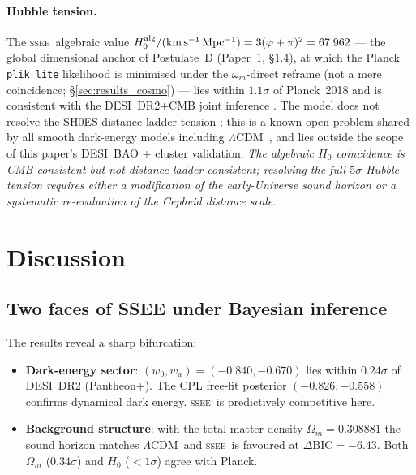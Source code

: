 \documentclass[12pt,a4paper]{article}
\newcommand{\SSEE}{\ifmmode\mathrm{SSEE}\else\textsc{ssee}\fi}
\newcommand{\LCDM}{\ifmmode\Lambda\mathrm{CDM}\else$\Lambda$CDM\fi}
\newcommand{\wz}{w_0}
\newcommand{\wa}{w_a}
\begin{document}
\paragraph{Hubble tension.}
The \SSEE\ algebraic value $H_0^{\rm alg}/(\mathrm{km\,s^{-1}\,Mpc^{-1}}) = 3(\varphi+\pi)^2 = 67.962$
--- the global dimensional anchor of Postulate~D (Paper~1, \S1.4), at which the
Planck \texttt{plik\_lite} likelihood is minimised under the $\omega_m$-direct
reframe (not a mere coincidence; \S\ref{sec:results_cosmo}) ---
lies within $1.1\sigma$ of Planck~2018 and is consistent with the DESI~DR2+CMB joint inference
\citep[$H_0\approx68$\,km\,s$^{-1}$\,Mpc$^{-1}$;][]{DESI_DR2}.
The model does not resolve the SH0ES distance-ladder tension
\citep[$H_0\approx73$\,km\,s$^{-1}$\,Mpc$^{-1}$;][]{Riess2022}; this is a known
open problem shared by all smooth dark-energy models including \LCDM\ \citep{Verde2019,Kamionkowski2023}, and lies outside
the scope of this paper's DESI~BAO + cluster validation.
\textit{The algebraic $H_0$ coincidence is CMB-consistent but not distance-ladder consistent;
resolving the full $5\sigma$ Hubble tension requires either a modification of the
early-Universe sound horizon or a systematic re-evaluation of the Cepheid distance scale.}

\section{Discussion}
\label{sec:discussion}

\subsection{Two faces of SSEE under Bayesian inference}

The results reveal a sharp bifurcation:

\begin{itemize}
  \item \textbf{Dark-energy sector}: $(\wz,\wa)=(-0.840,-0.670)$
    lies within $0.24\sigma$ of DESI~DR2 (Pantheon+). The CPL free-fit posterior
    $(-0.826,-0.558)$ confirms dynamical dark energy. \SSEE\ is
    predictively competitive here.

  \item \textbf{Background structure}: with the total matter density
    $\Omega_m=0.308881$ the sound horizon matches \LCDM\ and \SSEE\ is favoured
    at $\Delta\mathrm{BIC}=-6.43$. Both $\Omega_m$ ($0.34\sigma$) and $H_0$
    ($<1\sigma$) agree with Planck.
\end{itemize}
\end{document}
